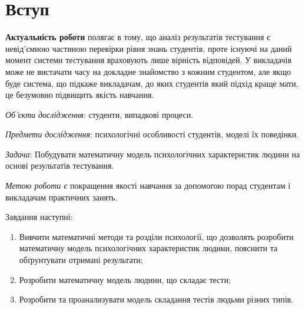 \chapter*{Вступ}

\textbf{Актуальність роботи} полягає в тому, що
аналіз результатів тестування є невід’ємною частиною перевірки рівня знань
студентів, проте існуючі на даний момент системи тестування враховують
лише вірність відповідей.
У викладачів може не вистачати часу на докладне знайомство з кожним студентом,
але якщо буде система, що підкаже викладачам, до яких
студентів який підхід краще мати, це безумовно підвищить якість навчання.

\textit{Об’єкти дослідження}:
студенти, випадкові процеси.

\textit{Предмети дослідження}:
психологічні особливості студентів, моделі їх поведінки.

\textit{Задача}:
Побудувати математичну модель психологічних характеристик людини на основі
результатів тестування.

\textit{Метою роботи є}
покращення якості навчання за допомогою порад студентам і викладачам
практичних занять.

Завдання наступні:
\begin{enumerate}
  \item
    Вивчити математичні методи та розділи психології, що дозволять розробити
    математичну модель психологічних характеристик людини,
    пояснити та обґрунтувати отримані результати;
  \item
    Розробити математичну модель людини, що складає тести;
  \item
    Розробити та проанализувати модель складання тестів людьми різних типів.
\end{enumerate}

